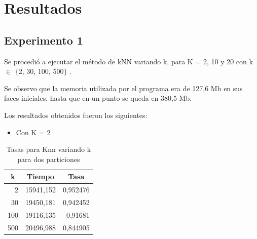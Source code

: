 \section{Resultados}



\subsection{Experimento 1}
Se procedió a ejecutar el método de kNN variando k, para K = 2, 10 y 20 con k $\in$ $\{$2, 30, 100, 500$\}$ .

Se observo que la memoria utilizada por el programa era de 127,6 Mb en sus faces iniciales, hasta que en un punto se queda en 380,5 Mb.

Los resultados obtenidos fueron los siguientes:
\begin{itemize}
\item Con K = 2\\
\end{itemize}

\begin{table}[H]
\centering
\begin{tabular}{|r|r|r|}
\hline
\multicolumn{1}{|c|}{k} & \multicolumn{1}{c|}{Tiempo} & \multicolumn{1}{c|}{Tasa} \\ \hline
2 & 15941,152 & 0,952476 \\ \hline
30 & 19450,181 & 0,942452 \\ \hline
100 & 19116,135 & 0,91681 \\ \hline
500 & 20496,988 & 0,844905 \\ \hline
\end{tabular}
\caption{Tasas para Knn variando k para dos particiones}
\label{}
\end{table}

\bigskip
\bigskip
\bigskip

